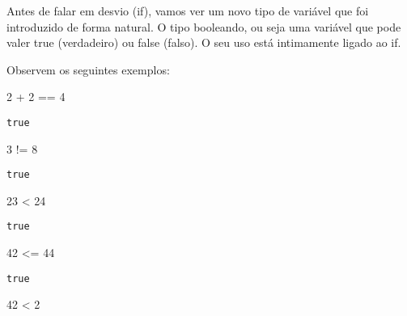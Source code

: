 \documentclass[
  letterpaper,
  DIV=11,
  numbers=noendperiod]{scrreprt}
\newenvironment{Shaded}{\begin{snugshade}}{\end{snugshade}}
\newcommand{\FloatTok}[1]{\textcolor[rgb]{0.68,0.00,0.00}{#1}}
\newcommand{\OperatorTok}[1]{\textcolor[rgb]{0.37,0.37,0.37}{#1}}
\begin{document}
Antes de falar em desvio (if), vamos ver um novo tipo de variável que
foi introduzido de forma natural. O tipo booleando, ou seja uma variável
que pode valer true (verdadeiro) ou false (falso). O seu uso está
intimamente ligado ao if.

Observem os seguintes exemplos:

\begin{Shaded}
\begin{Highlighting}[]
\FloatTok{2} \OperatorTok{+} \FloatTok{2} \OperatorTok{==} \FloatTok{4}
\end{Highlighting}
\end{Shaded}

\begin{verbatim}
true
\end{verbatim}

\begin{Shaded}
\begin{Highlighting}[]
\FloatTok{3} \OperatorTok{!=} \FloatTok{8}
\end{Highlighting}
\end{Shaded}

\begin{verbatim}
true
\end{verbatim}

\begin{Shaded}
\begin{Highlighting}[]
\FloatTok{23} \OperatorTok{\textless{}} \FloatTok{24}
\end{Highlighting}
\end{Shaded}

\begin{verbatim}
true
\end{verbatim}

\begin{Shaded}
\begin{Highlighting}[]
\FloatTok{42} \OperatorTok{\textless{}=} \FloatTok{44}
\end{Highlighting}
\end{Shaded}

\begin{verbatim}
true
\end{verbatim}

\begin{Shaded}
\begin{Highlighting}[]
\FloatTok{42} \OperatorTok{\textless{}} \FloatTok{2}
\end{Highlighting}
\end{Shaded}
\end{document}
